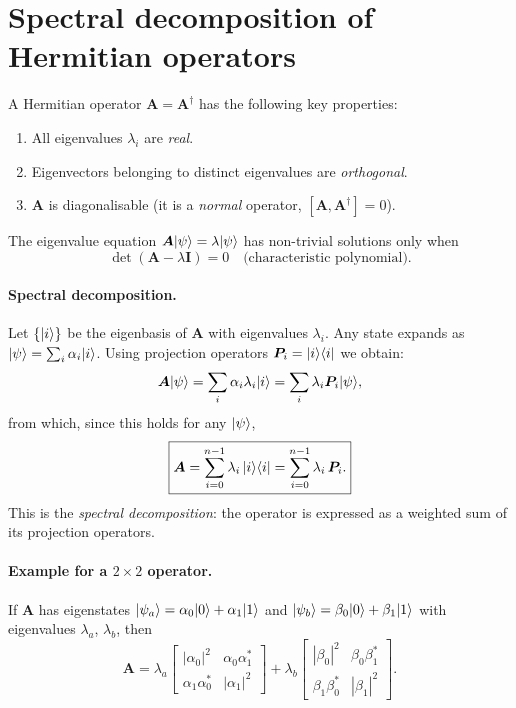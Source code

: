 \section{Spectral decomposition of Hermitian operators}
\label{sec:spectral}

A Hermitian operator $\bm{A}=\bm{A}^{\dagger}$ has the following key
properties:
\begin{enumerate}
  \item All eigenvalues $\lambda_i$ are \emph{real}.
  \item Eigenvectors belonging to distinct eigenvalues are
        \emph{orthogonal}.
  \item $\bm{A}$ is diagonalisable (it is a \emph{normal} operator,
        $[\bm{A},\bm{A}^{\dagger}]=0$).
\end{enumerate}

The eigenvalue equation $\bm{A}\vert \psi \rangle=\lambda\vert \psi \rangle$
has non-trivial solutions only when
\[
  \det(\bm{A}-\lambda\bm{I})=0
  \quad\text{(characteristic polynomial).}
\]

\paragraph{Spectral decomposition.}
Let $\{\vert i \rangle\}$ be the eigenbasis of $\bm{A}$ with eigenvalues
$\lambda_i$.  Any state expands as
$\vert \psi \rangle=\sum_i\alpha_i\vert i \rangle$.
Using projection operators $\bm{P}_i=\vert i \rangle\langle i \vert$ we obtain:
\[
  \bm{A}\vert \psi \rangle
  =\sum_i\alpha_i\lambda_i\vert i \rangle
  =\sum_i\lambda_i\bm{P}_i\vert \psi \rangle,
\]
from which, since this holds for any $\vert \psi \rangle$,
\[
  \boxed{\bm{A}=\sum_{i=0}^{n-1}\lambda_i\,\vert i \rangle\langle i \vert
               =\sum_{i=0}^{n-1}\lambda_i\,\bm{P}_i.}
\]
This is the \emph{spectral decomposition}: the operator is expressed
as a weighted sum of its projection operators.

\paragraph{Example for a $2\times 2$ operator.}
If $\bm{A}$ has eigenstates
$\vert \psi_a \rangle=\alpha_0\vert 0 \rangle+\alpha_1\vert 1 \rangle$ and
$\vert \psi_b \rangle=\beta_0\vert 0 \rangle+\beta_1\vert 1 \rangle$
with eigenvalues $\lambda_a$, $\lambda_b$, then
\[
  \bm{A}
  =\lambda_a\begin{bmatrix}|\alpha_0|^2 & \alpha_0\alpha_1^*\\
                            \alpha_1\alpha_0^* & |\alpha_1|^2\end{bmatrix}
  +\lambda_b\begin{bmatrix}|\beta_0|^2 & \beta_0\beta_1^*\\
                            \beta_1\beta_0^* & |\beta_1|^2\end{bmatrix}.
\]

